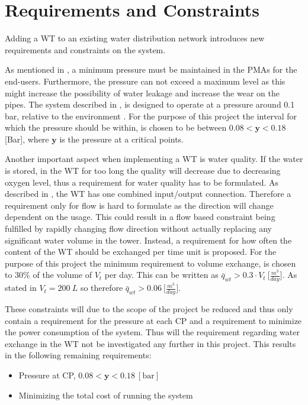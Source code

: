 \chapter{Requirements and Constraints}
\label{Requirements_and_constraints}

Adding a WT to an existing water distribution network introduces new requirements and constraints on the system. 

As mentioned in , a minimum pressure must be maintained in the PMAs for the end-users. Furthermore, the pressure can not exceed a maximum level as this might increase the possibility of water leakage and increase the wear on the pipes. The system described in , is designed to operate at a pressure around 0.1 bar, relative to the environment \cite{master_aau}. For the purpose of this project the interval for which the pressure should be within, is chosen to be between $0.08 < \bm{y} < 0.18$ [Bar], where $\bm{y}$ is the pressure at a critical points.

Another important aspect when implementing a WT is water quality. If the water is stored, in the WT for too long the quality will decrease due to decreasing oxygen level, thus a requirement for water quality has to be formulated. As described in , the WT has one combined input/output connection. Therefore a requirement only for flow is hard to formulate as the direction will change dependent on the usage. This could result in a flow based constraint being fulfilled by rapidly changing flow direction without actually replacing any significant water volume in the tower. Instead, a requirement for how often the content of the WT should be exchanged per time unit is proposed. For the purpose of this project the minimum requirement to volume exchange, is chosen to 30\% of the volume of $V_t$ per day. This can be written as $\bar{q}_{wt} > 0.3\cdot V_t \: \big[\frac{m^3}{day}\big]$. As stated in  $V_t = 200 \:L$ so therefore $\bar{q}_{wt} > 0.06 \: \big[\frac{m^3}{day}\big]$.

These constraints will due to the scope of the project be reduced and thus only contain a requirement for the pressure at each CP and a requirement to minimize the power consumption of the system. Thus will the requirement regarding water exchange in the WT not be investigated any further in this project. 
This results in the following remaining requirements:

\begin{itemize}
	\item Pressure at CP, $0.08 < \bm{y} < 0.18 \:[\text{bar}]$
%
	\item Minimizing the total cost of running the system
\end{itemize}
 